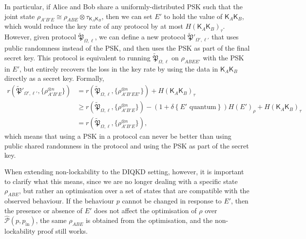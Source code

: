 \documentclass[10pt, a4paper]{article}
\numberwithin{equation}{section} %
\theoremstyle{definition}
\theoremstyle{plain}
\newcommand{\?}{\mathrel{?}} %
\newcommand{\indic}[1]{\delta{\left\{#1\right\}}} %
\newcommand{\crv}[1]{\mathsf{#1}}
\newcommand{\compatstates}[3][]{\hat{\mathcal{P}}#1(#2,#3)}
\newcommand{\qproto}[2][_{\Omega,\ell}]{\tilde{\mathfrak{#2}}#1}
\newcommand{\prin}[1][p]{#1_{\mathrm{in}}}
\begin{document}
              In particular, if Alice and Bob share a uniformly-distributed PSK such that the joint state \(\rho_{A'B'E} \cong \rho_{ABE} \otimes \tau_{\crv{K}_{A} \crv{K}_{B}}\), then we can set \(E'\) to hold the value of \(\crv{K}_{A} \crv{K}_{B}\), which would reduce the key rate of any protocol by at most \(H{(\crv{K}_{A} \crv{K}_{B})}_{\tau}\). However, given protocol \(\qproto{P}\), we can define a new protocol \(\qproto['_{\Omega',\ell'}]{P}\) that uses public randomness instead of the PSK, and then uses the PSK as part of the final secret key. This protocol is equivalent to running \(\qproto{P}\) on \(\rho_{ABEE'}\) with the PSK in \(E'\), but entirely recovers the loss in the key rate by using the data in \(\crv{K}_{A} \crv{K}_{B}\) directly as a secret key. Formally,
              \begin{align}
                r\left(\qproto['_{\Omega',\ell'}]{P}, {\{\rho_{A'B'E}^{\otimes n}\}} \right) &= r\left(\qproto{P}, {\{\rho_{A'B'EE'}^{\otimes n}\}} \right) + H{(\crv{K}_{A} \crv{K}_{B})}_{\tau} \\
                &\geq r\left(\qproto{P}, {\{\rho_{A'B'E}^{\otimes n}\}} \right) - (1+\indic{E' \text{ quantum}})H{(E')}_{\rho} + H{(\crv{K}_{A} \crv{K}_{B})}_{\tau} \\
                                                                                                      &= r\left(\qproto{P}, {\{\rho_{A'B'E}^{\otimes n}\}} \right),
              \end{align}
              which means that using a PSK in a protocol can never be better than using public shared randomness in the protocol and using the PSK as part of the secret key.

              When extending non-lockability to the DIQKD setting, however, it is important to clarify what this means, since we are no longer dealing with a specific state \(\rho_{ABE}\), but rather an optimisation over a set of states that are compatible with the observed behaviour. If the behaviour \(p\) cannot be changed in response to \(E'\), then the presence or absence of \(E'\) does not affect the optimisation of \(\rho\) over \(\compatstates{p}{\prin}\), the same \(\rho_{ABE}\) is obtained from the optimisation, and the non-lockability proof still works.
\end{document}

